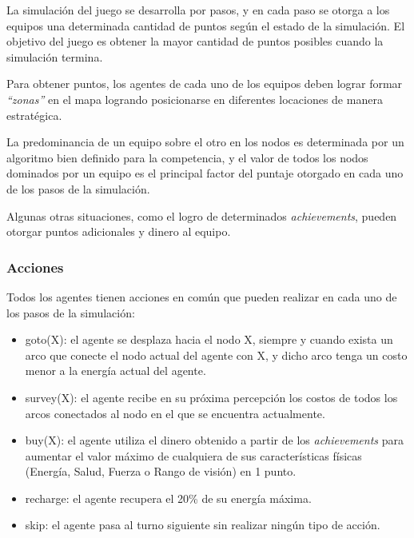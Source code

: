  La simulación del juego se desarrolla por pasos, y en cada paso se
 otorga a los equipos una determinada cantidad de puntos según el
 estado de la simulación.
 El objetivo del juego es obtener la mayor cantidad de puntos posibles
 cuando la simulación termina.
 
 Para obtener puntos, los agentes de cada uno de los equipos deben
 lograr formar \textit{"`zonas"'} en el mapa logrando posicionarse en
 diferentes locaciones de manera estratégica. 
 
 La predominancia de un equipo sobre el otro en los nodos es
 determinada por un algoritmo bien definido para la competencia, y el
 valor de todos los nodos dominados por un equipo es el principal
 factor del puntaje otorgado en cada uno de los pasos de la simulación.
 
 Algunas otras situaciones, como el logro de determinados
 \textit{achievements}, pueden otorgar puntos adicionales y dinero al
 equipo.

\subsubsection{Acciones}
\label{subsub:acciones}

 Todos los agentes tienen acciones en común que pueden realizar en cada
 uno de los pasos de la simulación:
 
 \begin{itemize}
 
 \item goto(X): el agente se desplaza hacia el nodo X, siempre y cuando
 exista un arco que conecte el nodo actual del agente con X, y dicho
 arco tenga un costo menor a la energía actual del agente.
 
 \item survey(X): el agente recibe en su próxima percepción los costos
 de todos los arcos conectados al nodo en el que se encuentra
 actualmente.
 
 \item buy(X): el agente utiliza el dinero obtenido a partir de los
 \textit{achievements} para aumentar el valor máximo de cualquiera de
 sus características físicas (Energía, Salud, Fuerza o Rango de visión)
 en 1 punto.
 
 \item recharge: el agente recupera el 20\% de su energía máxima.
 
 \item skip: el agente pasa al turno siguiente sin realizar ningún tipo
 de acción.
 
 \end{itemize}
 
